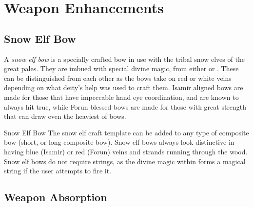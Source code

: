 \section{Weapon Enhancements}

\subsection{Snow Elf Bow}
\label{sec:Snow Elf Bow}

A \emph{snow elf bow} is a specially crafted bow in use with the tribal snow
elves of the great pales. They are imbued with special divine magic, from
either  or . These can be distinguished
from each other as the bows take on red or white veins depending on what deity's
help was used to craft them. Isamir aligned bows are made for those that have
impeccable hand eye coordination, and are known to always hit true, while Forun
blessed bows are made for those with great strength that can draw even the
heaviest of bows.

\begin{35e}{Snow Elf Bow}
  The snow elf craft template can be added to any type of composite bow (short,
  or long composite bow). Snow elf bows always look distinctive in having blue
  (Isamir) or red (Forun) veins and strands running through the wood. Snow elf
  bows do not require strings, as the divine magic within forms a magical string
  if the user attempts to fire it.

\end{35e}

\subsection{Weapon Absorption}
\label{sec:Weapon Absorption}

